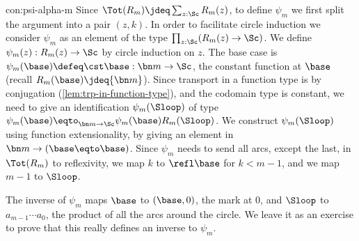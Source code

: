 \begin{implementation}{con:psi-alpha-m}
  Since $\Tot(R_m) \jdeq \sum_{z:\Sc}R_m(z)$,
  to define $\psi_m$ we first split the argument into a pair $(z,k)$.
  In order to facilitate circle induction we consider
  $\psi_m$ as an element of the type $\prod_{z:\Sc}(R_m(z) \to \Sc)$.
  We define $\psi_m(z) : R_m(z) \to \Sc$ by circle induction on $z$.
  The base case is $\psi_m(\base) \defeq \cst\base : \bn m \to \Sc$,
  the constant function at $\base$ (recall $R_m(\base)\jdeq{\bn m}$).
  Since transport in a function type is by conjugation
  (\cref{lem:trp-in-function-type}),
  and the codomain type is constant,
  we need to give an identification $\psi_m(\Sloop)$ of
  type $\psi_m(\base) \eqto_{\bn m\to\Sc} \psi_m(\base)R_m(\Sloop)$.
  We construct $\psi_m(\Sloop)$ using function extensionality,
  by giving an element in $\bn m\to(\base\eqto \base)$.
  Since $\psi_m$ needs to send all arcs, except the last,
  in $\Tot(R_m)$ to reflexivity,
  we map $k$ to $\refl\base$ for $k<m-1$,
  and we map $m-1$ to $\Sloop$.

  The inverse of $\psi_m$ maps $\base$ to $(\base,0)$, \ie the mark at $0$,
  and $\Sloop$ to $a_{m-1}\cdots a_0$,
  \ie the product of all the arcs around the circle.
  We leave it as an exercise to prove that this really defines an inverse to $\psi_m$.


\end{implementation}

